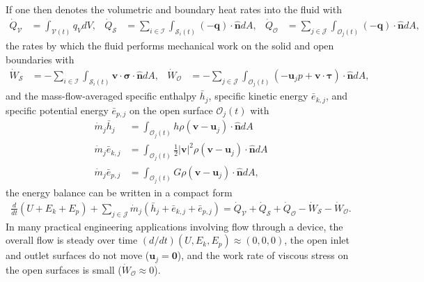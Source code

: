 If one then denotes the volumetric and boundary heat rates into the fluid with
\begin{align}
    \dot{Q}_{\mathcal{V}}&=\int_{\mathcal{V}(t)}q_VdV, & \dot{Q}_{\mathcal{S}}&=\sum_{i\in\mathcal{I}}\int_{\mathcal{S}_i(t)}(-\bm{q})\cdot\bm{\hat{n}}dA, & \dot{Q}_{\mathcal{O}}&=\sum_{j\in\mathcal{J}}\int_{\mathcal{O}_j(t)}(-\bm{q})\cdot\bm{\hat{n}}dA,
\end{align}
the rates by which the fluid performs mechanical work on the solid and open boundaries with 
\begin{align}
    \dot{W}_{\mathcal{S}}&=-\sum_{i\in\mathcal{I}}\int_{\mathcal{S}_i(t)}\bm{v}\cdot\bm{\sigma}\cdot\bm{\hat{n}}dA, & \dot{W}_{\mathcal{O}}&=-\sum_{j\in\mathcal{J}}\int_{\mathcal{O}_j(t)}(-\bm{u}_jp+\bm{v}\cdot\bm{\tau})\cdot\bm{\hat{n}}dA,
\end{align}
and the mass-flow-averaged specific enthalpy $\bar{h}_j$, specific kinetic energy $\bar{e}_{k,j}$, and specific potential energy $\bar{e}_{p,j}$ on the open surface $\mathcal{O}_j(t)$ with
\begin{align}
    \dot{m}_j\bar{h}_j&=\int_{\mathcal{O}_j(t)}h\rho(\bm{v}-\bm{u}_j)\cdot\bm{\hat{n}}dA\\
    \dot{m}_j\bar{e}_{k,j}&=\int_{\mathcal{O}_j(t)}\frac{1}{2}|\bm{v}|^2\rho(\bm{v}-\bm{u}_j)\cdot\bm{\hat{n}}dA\\
    \dot{m}_j\bar{e}_{p,j}&=\int_{\mathcal{O}_j(t)}G\rho(\bm{v}-\bm{u}_j)\cdot\bm{\hat{n}}dA,
\end{align}
the energy balance can be written in a compact form
\begin{align}\label{eq:energy-balance-control-volume}
    \frac{d}{dt}(U+E_k+E_p)+\sum_{j\in\mathcal{J}}\dot{m}_j(\bar{h}_j+\bar{e}_{k,j}+\bar{e}_{p,j})=\dot{Q}_\mathcal{V}+\dot{Q}_\mathcal{S}+\dot{Q}_\mathcal{O}-\dot{W}_\mathcal{S}-\dot{W}_\mathcal{O}.
\end{align}
In many practical engineering applications involving flow through a device, the overall flow is steady over time $(d/dt)(U,E_k,E_p)\approx (0,0,0)$, the open inlet and outlet surfaces do not move ($\bm{u}_j=\bm{0}$), and the work rate of viscous stress on the open surfaces is small ($\dot{W}_\mathcal{O}\approx 0$).

